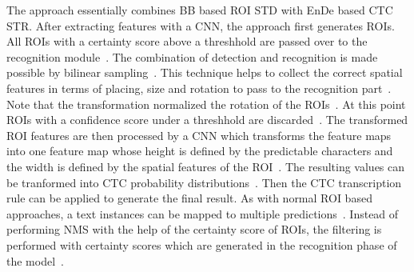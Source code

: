 The approach essentially combines \ac{BB} based \ac{ROI} \ac{STD} with \ac{EnDe} based \ac{CTC}
\ac{STR}.
After extracting features with a \ac{CNN}, the approach first generates \acp{ROI}.
All \acp{ROI} with a certainty score above a threshhold are passed over to the recognition
module~\citep{busta_deep_2017}.
The combination of detection and recognition is made possible by bilinear
sampling~\cite{busta_deep_2017}.
This technique helps to collect the correct spatial features in terms of placing, size and rotation
to pass to the recognition part~\citep{busta_deep_2017}.
Note that the transformation normalized the rotation of the \acp{ROI}~\citep{busta_deep_2017}.
At this point \acp{ROI} with a confidence score under a threshhold are
discarded~\citep{busta_deep_2017}.
The transformed \ac{ROI} features are then processed by a \ac{CNN} which transforms the feature maps
into one feature map whose height is defined by the predictable characters and the width is defined
by the spatial features of the \ac{ROI}~\citep{busta_deep_2017}.
The resulting values can be tranformed into \ac{CTC} probability
distributions~\citep{busta_deep_2017,graves_connectionist_2006}.
Then the \ac{CTC} transcription rule can be applied to generate the final result.
As with normal \ac{ROI} based approaches, a text instances can be mapped to multiple
predictions~\citep{ren_faster_2016,busta_deep_2017}.
Instead of performing \ac{NMS} with the help of the certainty score of \acp{ROI}, the filtering
is performed with certainty scores which are generated in the recognition phase of the
model~\citep{busta_deep_2017}.

